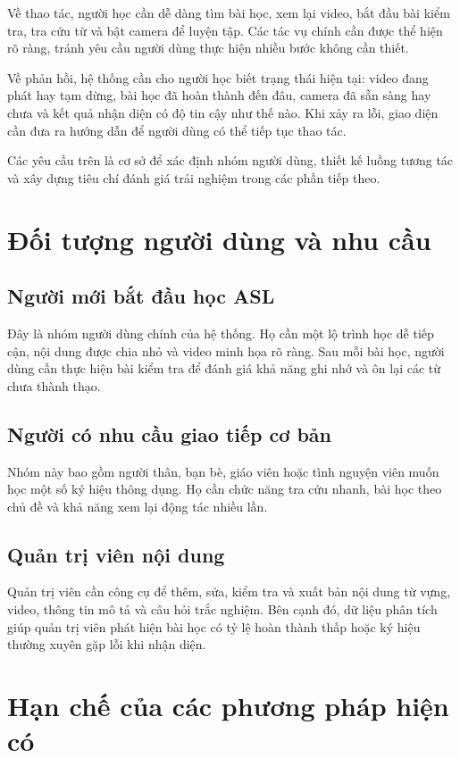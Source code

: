 Về thao tác, người học cần dễ dàng tìm bài học, xem lại video, bắt đầu bài kiểm
tra, tra cứu từ và bật camera để luyện tập. Các tác vụ chính cần được thể hiện
rõ ràng, tránh yêu cầu người dùng thực hiện nhiều bước không cần thiết.

Về phản hồi, hệ thống cần cho người học biết trạng thái hiện tại: video đang
phát hay tạm dừng, bài học đã hoàn thành đến đâu, camera đã sẵn sàng hay chưa
và kết quả nhận diện có độ tin cậy như thế nào. Khi xảy ra lỗi, giao diện cần
đưa ra hướng dẫn để người dùng có thể tiếp tục thao tác.

Các yêu cầu trên là cơ sở để xác định nhóm người dùng, thiết kế luồng tương tác
và xây dựng tiêu chí đánh giá trải nghiệm trong các phần tiếp theo.

\section{Đối tượng người dùng và nhu cầu}

\subsection{Người mới bắt đầu học ASL}

Đây là nhóm người dùng chính của hệ thống. Họ cần một lộ trình học dễ tiếp cận,
nội dung được chia nhỏ và video minh họa rõ ràng. Sau mỗi bài học, người dùng
cần thực hiện bài kiểm tra để đánh giá khả năng ghi nhớ và ôn lại các từ chưa
thành thạo.

\subsection{Người có nhu cầu giao tiếp cơ bản}

Nhóm này bao gồm người thân, bạn bè, giáo viên hoặc tình nguyện viên muốn học
một số ký hiệu thông dụng. Họ cần chức năng tra cứu nhanh, bài học theo chủ đề
và khả năng xem lại động tác nhiều lần.

\subsection{Quản trị viên nội dung}

Quản trị viên cần công cụ để thêm, sửa, kiểm tra và xuất bản nội dung từ vựng,
video, thông tin mô tả và câu hỏi trắc nghiệm. Bên cạnh đó, dữ liệu phân tích
giúp quản trị viên phát hiện bài học có tỷ lệ hoàn thành thấp hoặc ký hiệu
thường xuyên gặp lỗi khi nhận diện.

\section{Hạn chế của các phương pháp hiện có}

